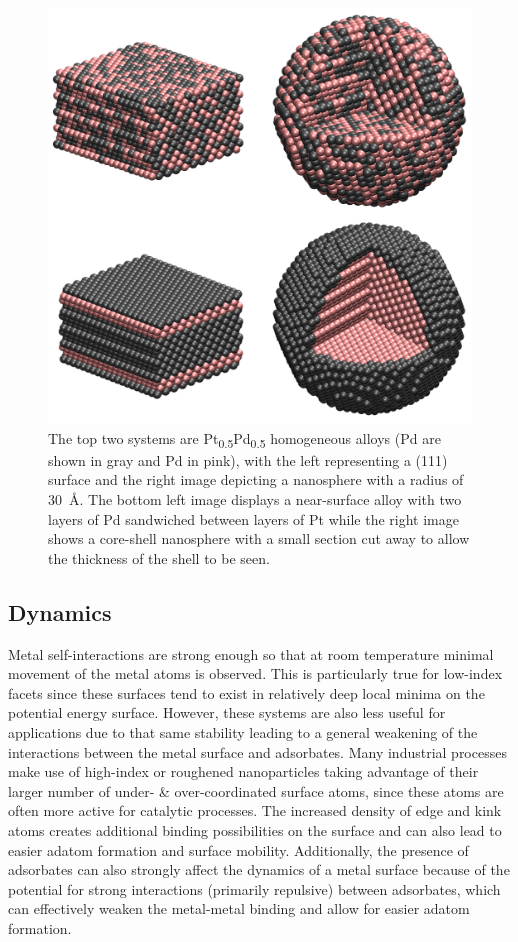 \begin{figure}[p!]
  \includegraphics[width=\linewidth]{../figures/chap1/bimetallic.pdf}
\caption{The top two systems are Pt\textsubscript{0.5}Pd\textsubscript{0.5}
homogeneous alloys (Pd are shown in gray and Pd in pink), with the left
representing a (111) surface and the right image depicting a nanosphere with a
radius of 30~\AA. The bottom left image displays a near-surface alloy with two
layers of Pd sandwiched between layers of Pt while the right image shows a
core-shell nanosphere with a small section cut away to allow the thickness of
the shell to be seen.}
\label{fig:bimetallic} 
\end{figure}

\subsection{Dynamics}
Metal self-interactions are strong enough so that at room temperature minimal
movement of the metal atoms is observed. This is particularly true for
low-index facets since these surfaces tend to exist in relatively deep local
minima on the potential energy surface. However, these systems are also less
useful for applications due to that same stability leading to a general
weakening of the interactions between the metal surface and adsorbates.  Many
industrial processes make use of high-index or roughened nanoparticles taking
advantage of their larger number of under- \& over-coordinated surface atoms,
since these atoms are often more active for catalytic
processes.\citep{Stephens:2011bv, Calle-Vallejo:2015qq} The increased density
of edge and kink atoms creates additional binding possibilities on the surface
and can also lead to easier adatom formation and surface mobility.
Additionally, the presence of adsorbates can also strongly affect the dynamics
of a metal surface because of the potential for strong interactions (primarily
repulsive) between adsorbates, which can effectively weaken the metal-metal
binding and allow for easier adatom formation.\citep{Tao:2010aa, Eren:2016qt}


